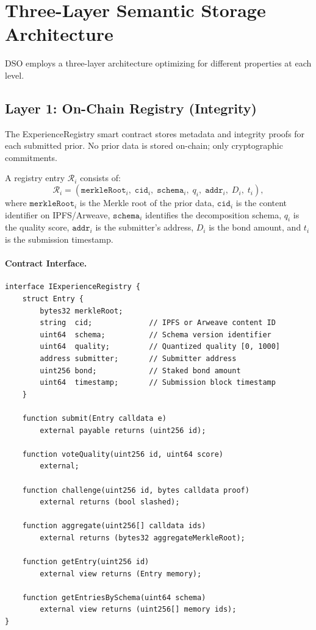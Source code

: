 \section{Three-Layer Semantic Storage Architecture}

\label{sec:architecture}

DSO employs a three-layer architecture optimizing for different properties at
each level.

\subsection{Layer 1: On-Chain Registry (Integrity)}

The ExperienceRegistry smart contract stores metadata and integrity proofs for
each submitted prior. No prior data is stored on-chain; only cryptographic
commitments.

\begin{definition}
A registry entry $\mathcal{R}_i$ consists of:
\begin{equation}
    \mathcal{R}_i = \left(\texttt{merkleRoot}_i, \; \texttt{cid}_i, \;
    \texttt{schema}_i, \; q_i, \; \texttt{addr}_i, \; D_i, \; t_i\right),
\end{equation}
where $\texttt{merkleRoot}_i$ is the Merkle root of the prior data,
$\texttt{cid}_i$ is the content identifier on IPFS/Arweave, $\texttt{schema}_i$
identifies the decomposition schema, $q_i$ is the quality score, $\texttt{addr}_i$
is the submitter's address, $D_i$ is the bond amount, and $t_i$ is the
submission timestamp.
\end{definition}

\paragraph{Contract Interface.}
\begin{verbatim}
interface IExperienceRegistry {
    struct Entry {
        bytes32 merkleRoot;
        string  cid;             // IPFS or Arweave content ID
        uint64  schema;          // Schema version identifier
        uint64  quality;         // Quantized quality [0, 1000]
        address submitter;       // Submitter address
        uint256 bond;            // Staked bond amount
        uint64  timestamp;       // Submission block timestamp
    }

    function submit(Entry calldata e)
        external payable returns (uint256 id);

    function voteQuality(uint256 id, uint64 score)
        external;

    function challenge(uint256 id, bytes calldata proof)
        external returns (bool slashed);

    function aggregate(uint256[] calldata ids)
        external returns (bytes32 aggregateMerkleRoot);

    function getEntry(uint256 id)
        external view returns (Entry memory);

    function getEntriesBySchema(uint64 schema)
        external view returns (uint256[] memory ids);
}
\end{verbatim}

